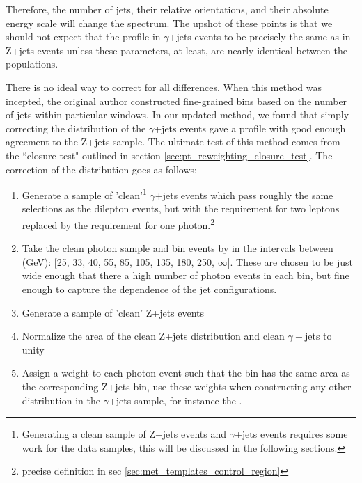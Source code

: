     Therefore, the number of jets, their relative orientations, and their absolute energy scale will change the \MET spectrum. The upshot of these points is that we should not expect that the \MET profile in $\gamma$+jets events to be precisely the same as in Z+jets events unless these parameters, at least, are nearly identical between the populations. 

    There is no ideal way to correct for all differences. When this method was incepted\cite{MET_templates}, the original author constructed fine-grained bins based on the number of jets within particular \pt windows. In our updated method, we found that simply correcting the \pt distribution of the $\gamma$+jets events gave a \MET profile with good enough agreement to the Z+jets sample. The ultimate test of this method comes from the ``closure test" outlined in section \ref{sec:pt_reweighting_closure_test}. The correction of the \pt distribution goes as follows:

    \begin{enumerate}
      \item Generate a sample of 'clean'\footnote{Generating a clean sample of Z+jets events and $\gamma$+jets events requires some work for the data samples, this will be discussed in the following sections.} $\gamma$+jets events which pass roughly the same selections as the dilepton events, but with the requirement for two leptons replaced by the requirement for one photon.\footnote{precise definition in sec \ref{sec:met_templates_control_region}} 

      \item Take the clean photon sample and bin events by \pt in the intervals between (GeV): [25, 33, 40, 55, 85, 105, 135, 180, 250, $\infty$]. These are chosen to be just wide enough that there a high number of photon events in each bin, but fine enough to capture the \pt dependence of the jet configurations. 

      \item Generate a sample of 'clean' Z+jets events

      \item Normalize the area of the clean Z+jets \pt distribution and clean $\gamma+$jets to unity

      \item Assign a weight to each photon event such that the bin has the same area as the corresponding Z+jets \pt bin, use these weights when constructing any other distribution in the $\gamma$+jets sample, for instance the \MET.
    \end{enumerate}

